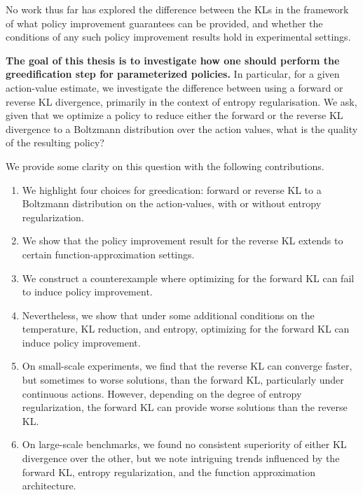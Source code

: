 \documentclass[\main/thesis.tex]{subfiles}
\begin{document}
No work thus far has explored the difference between the KLs in the framework of what policy improvement guarantees can be provided, and whether the conditions of any such policy improvement results hold in experimental settings. 
 
 
\textbf{The goal of this thesis is to investigate how one should perform the greedification step for parameterized policies.} In particular, for a given action-value estimate, we investigate the difference between using a forward or reverse KL divergence, primarily in the context of entropy regularisation. We ask, given that we optimize a policy to reduce either the forward or the reverse KL divergence to a Boltzmann distribution over the action values, what is the quality of the resulting policy?


We provide some clarity on this question with the following contributions. 
\begin{enumerate}
    \item We highlight four choices for greedication: forward or reverse KL to a Boltzmann distribution on the action-values, with or without entropy regularization.
    
    \item We show that the policy improvement result for the reverse KL extends to certain function-approximation settings.
    
    \item We construct a counterexample where optimizing for the forward KL can fail to induce policy improvement. 
    
    \item Nevertheless, we show that under some additional conditions on the temperature, KL reduction, and entropy, optimizing for the forward KL can induce policy improvement.
    
    \item On small-scale experiments, we find that the reverse KL can converge faster, but sometimes to worse solutions, than the forward KL, particularly under continuous actions. However, depending on the degree of entropy regularization, the forward KL can provide worse solutions than the reverse KL. 
    
    \item On large-scale benchmarks, we found no consistent superiority of either KL divergence over the other, but we note intriguing trends influenced by the forward KL, entropy regularization, and the function approximation architecture.
\end{enumerate}
 
\end{document}
